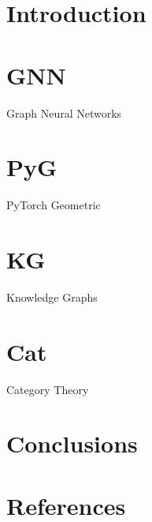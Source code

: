 \section[Intro]{Introduction}


\section{GNN}{Graph Neural Networks}


\section{PyG}{PyTorch Geometric}


\section{KG}{Knowledge Graphs}


\section{Cat}{Category Theory}


\section[Conclusions]{Conclusions}


\section[Refs]{References}
